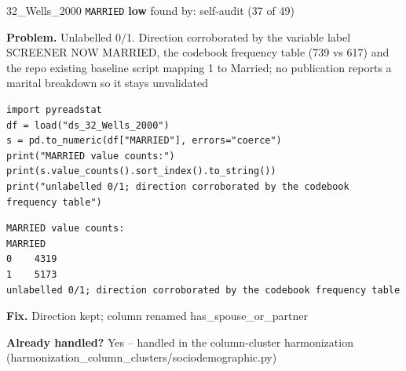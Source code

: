 \documentclass[9pt, t, handout]{beamer}
\newcommand{\ans}[1]{\textcolor{structure.fg}{#1}}
\begin{document}
\begin{frame}[fragile]{32\_Wells\_2000 \quad \texttt{MARRIED}}
  {\scriptsize\textcolor{black!55}{\textbf{low}} \quad
   found by: self-audit \quad (37 of 49)}
  \vspace{3pt}

  {\footnotesize \textbf{Problem.} Unlabelled 0/1. Direction corroborated by the variable label SCREENER NOW MARRIED, the codebook frequency table (739 vs 617) and the repo existing baseline script mapping 1 to Married; no publication reports a marital breakdown so it stays unvalidated}
  \vspace{4pt}

  \begin{Verbatim}[fontsize=\tiny, frame=single, framesep=2pt, label=\tiny reproduce]
import pyreadstat
df = load("ds_32_Wells_2000")
s = pd.to_numeric(df["MARRIED"], errors="coerce")
print("MARRIED value counts:")
print(s.value_counts().sort_index().to_string())
print("unlabelled 0/1; direction corroborated by the codebook frequency table")
  \end{Verbatim}
  \begin{Verbatim}[fontsize=\tiny, frame=single, framesep=2pt, label=\tiny output]
MARRIED value counts:
MARRIED
0    4319
1    5173
unlabelled 0/1; direction corroborated by the codebook frequency table
  \end{Verbatim}
  \vspace{2pt}

  {\footnotesize \textbf{Fix.} Direction kept; column renamed has\_spouse\_or\_partner}
  \vspace{2pt}

  {\footnotesize \textbf{Already handled?} \ans{Yes} -- handled in the column-cluster harmonization
   (harmonization\_column\_clusters/sociodemographic.py)}
\end{frame}
\end{document}
